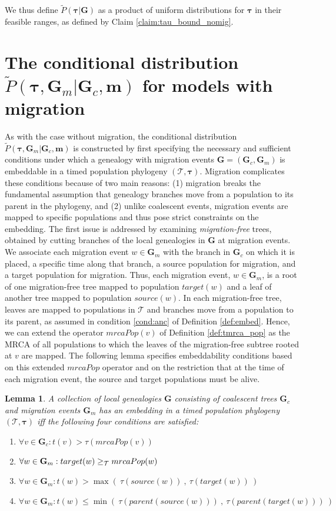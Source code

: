 \documentclass[11pt]{article}
\newcommand{\vect}[1]{\boldsymbol{\mathbf{#1}}}
\newcommand{\Tr}{\mathcal{T}}
\newcommand{\G}{\vect{G}}
\newcommand{\Pref}{\widetilde{P}}
\newcommand{\1}{\mathbbm{1}}
\newcommand{\Gc}{\G_c}
\newcommand{\Gm}{\G_m}
\newtheorem{lemma}{Lemma}
\newcommand{\taus}{\vect\tau}
\newcommand{\migs}{\vect{m}}
\begin{document}
We thus define $\Pref(\taus|\G)$ as a product of uniform distributions for $\taus$ in their feasible ranges, as defined by Claim \ref{claim:tau_bound_nomig}.

\section{\texorpdfstring{The conditional distribution  $\Pref(\taus,\Gm|\Gc,\migs)$ for models with migration}{Conditional distribution with migration}}\label{ap:cond_mig}

As with the case without migration, the conditional distribution $\Pref(\taus,\Gm|\Gc,\migs)$ is constructed by first specifying the necessary and sufficient conditions
under which a genealogy with migration events $\G=(\Gc,\Gm)$ is embeddable in a timed population phylogeny $(\Tr,\taus)$.
%
Migration complicates these conditions because of two main reasons:
(1) migration breaks the fundamental assumption that genealogy branches move from a population to its parent in the phylogeny,
and (2) unlike coalescent events, migration events are mapped to specific populations and thus pose strict constraints on the embedding.
%
The first issue is addressed by examining \emph{migration-free} trees, obtained by cutting branches of the local genealogies in $\G$ at migration events.
%
We associate each migration event  $w\in\Gm$ with the branch in $\Gc$ on which it is placed, a specific time along that branch, a source population for migration, and a target population for migration.
%
Thus, each migration event, $w\in\Gm$, is a root of one migration-free tree mapped to population $target(w)$ and a leaf of another tree mapped to population $source(w)$.
%
In each migration-free tree, leaves are mapped to populations in $\Tr$ and branches move from a population to its parent, as assumed in condition \ref{cond:anc} of Definition \ref{def:embed}.
Hence, we can extend the operator $mrcaPop(v)$ of Definition \ref{def:tmrca_pop} as the MRCA of all populations to which the leaves of the migration-free subtree rooted at $v$ are mapped.
%
The following lemma specifies embeddability conditions based on this extended $mrcaPop$ operator and on the restriction that at the time of each migration event,
the source and target populations must be alive.


\begin{lemma}\label{lem:embed_mig}
 A collection of local genealogies $\G$  consisting of coalescent trees $\Gc$ and migration events $\Gm$ has an embedding in a timed population phylogeny $(\Tr,\taus)$ iff
 the following four conditions are satisfied:
 \begin{enumerate}
  \item \label{cond:ub_coal}  $\forall v\in \Gc: t(v) > \tau(mrcaPop(v))$
  \item \label{cond:mrca_mig} $\forall w\in\Gm: target(w)\anc mrcaPop(w)$
  \item \label{cond:ub_mig}   $\forall w\in\Gm: t(w) > \max(~\tau(source(w))~,~\tau(target(w))~)$
  \item \label{cond:lb_mig}   $\forall w\in\Gm: t(w) \leq \min(~\tau(parent(source(w)))~,~\tau(parent(target(w)))~)$
 \end{enumerate}
\end{lemma}
\end{document}
